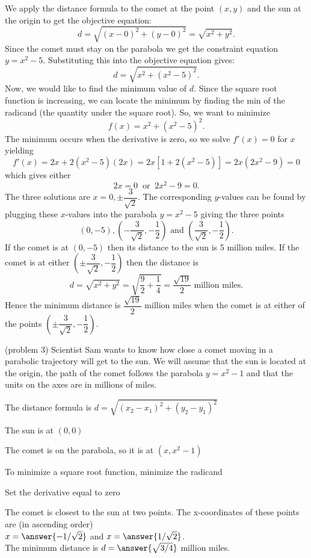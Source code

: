 \documentclass[handout]{ximera}
\begin{document}
\begin{example}[example 3]
We apply the distance formula to the comet at the point $(x, y)$ and the sun at the origin to get the objective equation:
\[d = \sqrt{(x-0)^2 + (y-0)^2} = \sqrt{x^2 + y^2}.\]
Since the comet must stay on the parabola we get the constraint equation $y = x^2 - 5$.  Substituting this into the objective equation gives:
\[d = \sqrt{x^2 + (x^2 - 5)^2}.\]
Now, we would like to find the minimum value of $d$. Since the square root function is increasing, 
we can locate the minimum by finding the min of the radicand (the quantity under the square root).
So, we want to minimize 
\[
f(x) = x^2 + (x^2 - 5)^2.
\]
The minimum occurs when the derivative is zero, so we solve
$f'(x) = 0$ for $x$ yielding
\[f'(x) = 2x + 2(x^2 - 5)(2x) = 2x[1+ 2(x^2 - 5)] = 2x(2x^2 - 9) = 0\]
which gives either 
\[2x = 0 \;\; \text{or} \;\; 2x^2 - 9 = 0.\]
The three solutions are $x = 0, \pm \dfrac{3}{\sqrt2}$.
The corresponding $y$-values can be found by plugging these $x$-values into the parabola $y = x^2 - 5$
giving the three points
\[(0, -5), \left(-\dfrac{3}{\sqrt 2}, -\dfrac12 \right) \mbox{ and } \left(\dfrac{3}{\sqrt 2}, -\dfrac12 \right).\]
If the comet is at $(0, -5)$ then its distance to the sun is 5 million miles.  If the comet is at 
either $\left(\pm\dfrac{3}{\sqrt 2}, -\dfrac12\right)$ then the distance is 
\[d = \sqrt{x^2 + y^2} = \sqrt{{\frac{9}{2} + \frac14}} = \frac{\sqrt {19}}{2} \mbox{ million miles}.\]
Hence the minimum distance is $\dfrac{\sqrt{19}}{2}$ million miles when the comet is at either of the points 
$\left(\pm\dfrac{3}{\sqrt 2}, -\dfrac12 \right)$.
\end{example}

\begin{problem}(problem 3)
Scientist Sam wants to know how close a comet moving in a parabolic trajectory will get to the sun. 
We will assume that the sun is located at the origin, 
the path of the comet follows the parabola $y = x^2 - 1$ and that the units 
on the axes are in millions of miles.



\begin{hint}
The distance formula is $d = \sqrt{(x_2 - x_1)^2 + (y_2 - y_1)^2}$
\end{hint}
\begin{hint}
The sun is at $(0,0)$
\end{hint}
\begin{hint}
The comet is on the parabola, so it is at $(x, x^2 - 1)$
\end{hint}
\begin{hint}
To minimize a square root function, minimize the radicand
\end{hint}
\begin{hint}
Set the derivative equal to zero
\end{hint}

The comet is closest to the sun at two points.
 The x-coordinates of these points are (in ascending order)\\
$x =  \answer{-1/\sqrt2}$ and $x = \answer{1/\sqrt2}$.\\
The minimum distance is $d = \answer{\sqrt{3/4}}$ million miles.
\end{problem}
\end{document}

